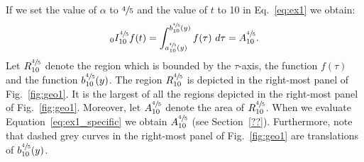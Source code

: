 \documentclass[twoside,reqno,11pt]{fcaa-var} %
\begin{document}
\noindent
If we set the value of $\alpha$ to $\sfrac{4}{5}$ and the value of $t$ to 10 in Eq.~\eqref{eq:ex1} we obtain:
\begin{equation}
\label{eq:ex1_specific}
_0I_{10}^{\sfrac{4}{5}} f(t) = \int_{a_{10}^{\sfrac{4}{5}}(y)}^{b_{10}^{\sfrac{4}{5}}(y)} f(\tau)~d\tau = A_{10}^{\sfrac{4}{5}}. 
\end{equation}
Let $R_{10}^{\sfrac{4}{5}}$ denote the region which is bounded by the $\tau$-axis, the function $f(\tau)$ and the function $b_{10}^{\sfrac{4}{5}}(y)$. The region $R_{10}^{\sfrac{4}{5}}$ is depicted in the right-most panel of Fig.~\ref{fig:geo1}. It is the largest of all the regions depicted in the right-most panel of Fig.~\ref{fig:geo1}. Moreover, let $A_{10}^{\sfrac{4}{5}}$ denote the area of $R_{10}^{\sfrac{4}{5}}$. When we evaluate Equation~\ref{eq:ex1_specific} we obtain $A_{10}^{\sfrac{4}{5}}$ (see Section~\ref{??}). Furthermore, note that dashed grey curves in the right-most panel of Fig.~\ref{fig:geo1} are translations of $b_{10}^{\sfrac{4}{5}}(y)$.\\


\end{document}
